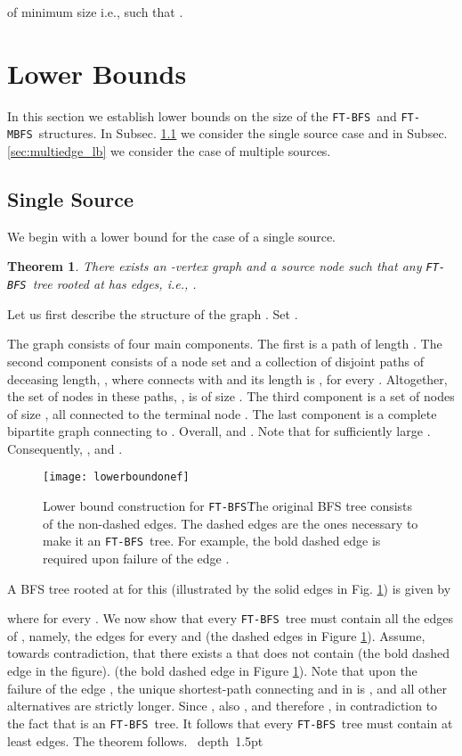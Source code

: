 \documentclass[12pt]{article}
\newtheorem{theorem}{Theorem}[section]
\def\Proof{\par\noindent{\bf Proof:~}}
\def\blackslug{\hbox{\hskip 1pt \vrule width 4pt height 8pt
    depth 1.5pt \hskip 1pt}}
\def\QED{\quad\blackslug\lower 8.5pt\null\par}
\def\FTMBFS{\mbox{\tt FT-MBFS}}
\def\FTBFS{\mbox{\tt FT-BFS}}
\begin{document}
of minimum size i.e., such that .

\section{Lower Bounds}
\label{sc:lb}
In this section we establish lower bounds on the size of the \FTBFS\ and
\FTMBFS\ structures.
In Subsec. \ref{sc:lb_single} we consider the single source case and
in Subsec. \ref{sec:multiedge_lb} we consider the case of multiple sources.

\subsection{Single Source}
\label{sc:lb_single}
We begin with a lower bound for the case of a single source.
\begin{theorem}
\label{thm:lowerbound_edgeonef}
There exists an -vertex graph  and a source node  such
that any \FTBFS\ tree rooted at  has  edges,
i.e., .
\end{theorem}
\Proof
Let us first describe the structure of the graph .
Set .

The graph consists of four main components.
The first is a path  of length .
The second component consists of a node set 
and a collection of  disjoint paths of deceasing length, ,
where  connects  with  and its length is , for every .
Altogether, the set of nodes in these paths, ,
is of size .
The third component is a set of nodes  of size ,
all connected to the terminal node .
The last component is a complete bipartite graph 
connecting  to .
Overall,  and .
Note that  for sufficiently large . Consequently,
, and .

\begin{figure}[htb!]
\begin{center}
\texttt{[image: lowerboundonef]}
\caption{Lower bound construction for \FTBFS\.
The original BFS tree consists of the non-dashed edges.
The dashed edges are the ones necessary to make it an \FTBFS\ tree.
For example, the bold dashed edge  is required
upon failure of the edge . \label{fig:lowerbound1f}}
\end{center}
\end{figure}

A BFS tree  rooted at  for this 
(illustrated by the solid edges in Fig. \ref{fig:lowerbound1f})
is given by

where  for every .
We now show that every \FTBFS\ tree  must contain
all the edges of , namely, the edges 
for every  and 
(the dashed edges in Figure \ref{fig:lowerbound1f}).
Assume, towards contradiction, that there exists
a  that does not contain 
(the bold dashed edge  in the figure).
(the bold dashed edge  in Figure \ref{fig:lowerbound1f}).
Note that upon the failure of the edge ,
the unique  shortest-path connecting  and  in
 is ,
and all other alternatives are strictly longer.
Since , also , and therefore
,
in contradiction to the fact that  is an \FTBFS\ tree.
It follows that every \FTBFS\ tree  must contain at least
 edges. The theorem follows.
\QED
\end{document}
